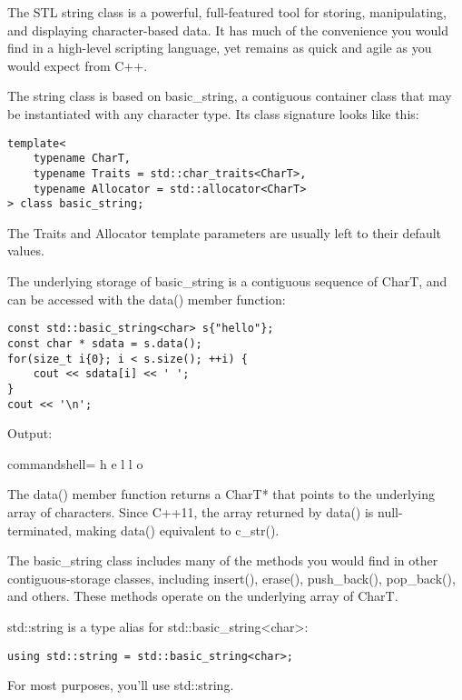The STL string class is a powerful, full-featured tool for storing, manipulating, and displaying character-based data. It has much of the convenience you would find in a high-level scripting language, yet remains as quick and agile as you would expect from C++.

The string class is based on basic\_string, a contiguous container class that may be instantiated with any character type. Its class signature looks like this:

\begin{lstlisting}[style=styleCXX]
template<
	typename CharT,
	typename Traits = std::char_traits<CharT>,
	typename Allocator = std::allocator<CharT>
> class basic_string;
\end{lstlisting}

The Traits and Allocator template parameters are usually left to their default values.

The underlying storage of basic\_string is a contiguous sequence of CharT, and can be accessed with the data() member function:

\begin{lstlisting}[style=styleCXX]
const std::basic_string<char> s{"hello"};
const char * sdata = s.data();
for(size_t i{0}; i < s.size(); ++i) {
	cout << sdata[i] << ' ';
}
cout << '\n';
\end{lstlisting}

Output:

\begin{tcblisting}{commandshell={}}
h e l l o
\end{tcblisting}

The data() member function returns a CharT* that points to the underlying array of characters. Since C++11, the array returned by data() is null-terminated, making data() equivalent to c\_str().

The basic\_string class includes many of the methods you would find in other contiguous-storage classes, including insert(), erase(), push\_back(), pop\_back(), and others. These methods operate on the underlying array of CharT.

std::string is a type alias for std::basic\_string<char>:

\begin{lstlisting}[style=styleCXX]
using std::string = std::basic_string<char>;
\end{lstlisting}

For most purposes, you'll use std::string.


